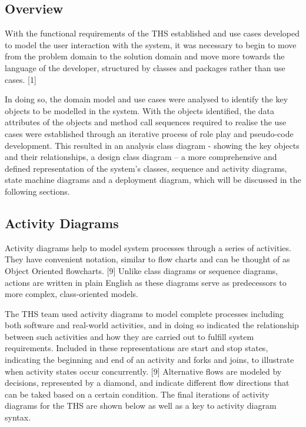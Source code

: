 \hypertarget{overview-2}{%
\subsection{Overview}\label{overview-2}}

With the functional requirements of the THS established and use cases
developed to model the user interaction with the system, it was
necessary to begin to move from the problem domain to the solution
domain and move more towards the language of the developer, structured
by classes and packages rather than use cases. {[}1{]}

In doing so, the domain model and use cases were analysed to identify
the key objects to be modelled in the system. With the objects
identified, the data attributes of the objects and method call sequences
required to realise the use cases were established through an iterative
process of role play and pseudo-code development. This resulted in an
analysis class diagram - showing the key objects and their
relationships, a design class diagram -- a more comprehensive and
defined representation of the system's classes, sequence and activity
diagrams, state machine diagrams and a deployment diagram, which will be
discussed in the following sections.

\hypertarget{activity-diagrams}{%
\subsection{Activity Diagrams}\label{activity-diagrams}}

Activity diagrams help to model system processes through a series of
activities. They have convenient notation, similar to flow charts and
can be thought of as Object Oriented flowcharts. {[}9{]} Unlike class
diagrams or sequence diagrams, actions are written in plain English as
these diagrams serve as predecessors to more complex, class-oriented
models.

The THS team used activity diagrams to model complete processes
including both software and real-world activities, and in doing so
indicated the relationship between such activities and how they are
carried out to fulfill system requirements. Included in these
representations are start and stop states, indicating the beginning and
end of an activity and forks and joins, to illustrate when activity
states occur concurrently. {[}9{]} Alternative flows are modeled by
decisions, represented by a diamond, and indicate different flow
directions that can be taked based on a certain condition. The final
iterations of activity diagrams for the THS are shown below as well as a
key to activity diagram syntax.

